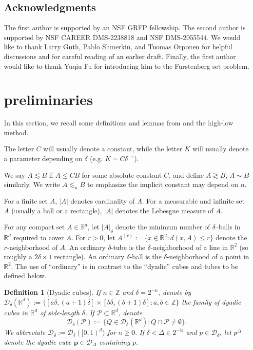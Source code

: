 \documentclass{amsart}
\newtheorem{definition}[prop]{Definition}
\newcommand{\Z}{\mathbb{Z}}
\newcommand{\R}{\mathbb{R}}
\newcommand{\eps}{\varepsilon}
\newcommand{\lesim}{\lesssim}
\newcommand{\gesim}{\gtrsim}
\newcommand{\bp}{\mathbf{p}}
\newcommand{\cD}{\mathcal{D}}
\newcommand{\cP}{\mathcal{P}}
\begin{document}
\subsection{Acknowledgments} The first author is supported by an NSF GRFP fellowship. The second author is supported by NSF CAREER DMS-2238818 and NSF DMS-2055544. We would like to thank Larry Guth, Pablo Shmerkin, and Tuomas Orponen for helpful discussions and  for careful reading of an earlier draft.  Finally, the first author would like to thank Yuqiu Fu for introducing him to the Furstenberg set problem.

\section{preliminaries}

In this section, we recall some definitions and lemmas from \cite{orponen2023projections} and the high-low method.

The letter $C$ will usually denote a constant, while the letter $K$ will usually denote a parameter depending on $\delta$ (e.g. $K = C \delta^{-\eps}$).

We say $A \lesim B$ if $A \le CB$ for some absolute constant $C$, and define $A \gesim B$, $A \sim B$ similarly. We write $A \lesim_n B$ to emphasize the implicit constant may depend on $n$.

For a finite set $A$, $|A|$ denotes cardinality of $A$. For a measurable and infinite set $A$ (usually a ball or a rectangle), $|A|$ denotes the Lebesgue measure of $A$.
 
For any compact set $A\in \mathbb{R}^d$, let $|A|_{\delta}$ denote the minimum number of $\delta$--balls in $\mathbb{R}^d$ required to cover $A$. For $r > 0$, let $A^{(r)} := \{ x \in \R^2 : d(x, A) \le r \}$ denote the $r$-neighborhood of $A$. An ordinary $\delta$-tube is the $\delta$-neighborhood of a line in $\R^2$ (so roughly a $2\delta \times 1$ rectangle). An ordinary $\delta$-ball is the $\delta$-neighborhood of a point in $\R^2$. The use of ``ordinary'' is in contrast to the ``dyadic'' cubes and tubes to be defined below.

\begin{definition}[Dyadic cubes]
    If $n\in \mathbb{Z}$ and $\delta=2^{-n}$, denote by $\cD_{\delta}(\mathbb{R}^d) := \{ [a\delta, (a+1)\delta] \times [b\delta, (b+1)\delta] : a, b \in \Z \}$ the family of dyadic cubes  in $\mathbb{R}^d$ of side-length $\delta$. If $\cP\subset \mathbb{R}^d$, denote 
    \[
    \cD_{\delta}(\cP):=\{ Q\in \cD_{\delta} (\R^d): Q\cap \cP\neq \emptyset\}.
    \]
    We abbreviate $\cD_{\delta}:=\cD_{\delta}([0,1)^d)$ for $n\geq 0$.  If $\delta <\Delta\in 2^{-\mathbb{N}}$ and $p\in \cD_{\delta}$, let $p^{\Delta}$ denote the dyadic cube $\bp \in \cD_{\Delta}$ containing $p$. 
\end{definition}
\end{document}

